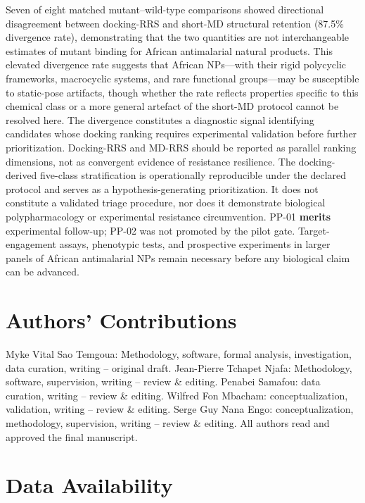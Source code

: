 \documentclass[journal=jcisd8,manuscript=article,layout=traditional]{achemso}
\begin{document}
Seven of eight matched mutant--wild-type comparisons showed directional disagreement between docking-RRS and short-MD structural retention (87.5\% divergence rate), demonstrating that the two quantities are not interchangeable estimates of mutant binding for African antimalarial natural products. This elevated divergence rate suggests that African NPs---with their rigid polycyclic frameworks, macrocyclic systems, and rare functional groups---may be susceptible to static-pose artifacts, though whether the rate reflects properties specific to this chemical class or a more general artefact of the short-MD protocol cannot be resolved here. The divergence constitutes a diagnostic signal identifying candidates whose docking ranking requires experimental validation before further prioritization. Docking-RRS and MD-RRS should be reported as parallel ranking dimensions, not as convergent evidence of resistance resilience. The docking-derived five-class stratification is operationally reproducible under the declared protocol and serves as a hypothesis-generating prioritization. It does not constitute a validated triage procedure, nor does it demonstrate biological polypharmacology or experimental resistance circumvention. PP-01 \textbf{merits} experimental follow-up; PP-02 was not promoted by the pilot gate. Target-engagement assays, phenotypic tests, and prospective experiments in larger panels of African antimalarial NPs remain necessary before any biological claim can be advanced.


\section*{Authors' Contributions}

Myke Vital Sao Temgoua: Methodology, software, formal analysis, investigation, data curation, writing -- original draft. Jean-Pierre Tchapet Njafa: Methodology, software, supervision, writing -- review \& editing. Penabei Samafou: data curation, writing -- review \& editing. Wilfred Fon Mbacham: conceptualization, validation, writing -- review \& editing. Serge Guy Nana Engo: conceptualization, methodology, supervision, writing -- review \& editing. All authors read and approved the final manuscript.

\section*{Data Availability}
\end{document}
